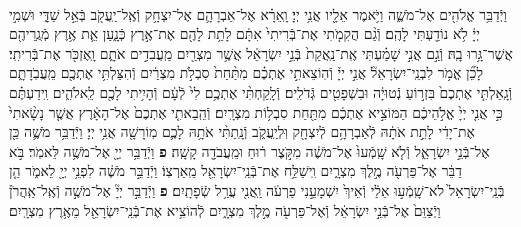 \documentclass[twoside, openany, parskip=half, 11pt]{book}
\begin{document}
\begin{footnotesize}
\begin{multicols}{2}
\\
וַיְֿדַבֵּ֥ר אֱלֹהִ֖ים אֶל־מֹשֶׁ֑ה וַיֹּ֥אמֶר אֵלָ֖יו אֲנִ֥י יְיָ׃ וָֽאֵרָ֗א אֶל־אַבְרָהָ֛ם אֶל־יִצְחָ֥ק וְֿאֶֽל־יַֽעֲקֹ֖ב בְּֿאֵ֣ל שַׁדָּ֑י וּשְׁמִ֣י יְיָ֔ לֹ֥א נוֹדַ֖עְתִּי לָהֶֽם׃ וְֿגַ֨ם הֲקִמֹ֤תִי אֶת־בְּֿרִיתִי֙ אִתָּ֔ם לָתֵ֥ת לָהֶ֖ם אֶת־אֶ֣רֶץ כְּֿנָ֑עַן אֵ֛ת אֶ֥רֶץ מְֿגֻֽרֵיהֶ֖ם אֲשֶׁר־גָּ֥רוּ בָֽהּ׃ וְֿגַ֣ם אֲנִ֣י שָׁמַ֗עְתִּי אֶֽת־נַֽאֲקַת֙ בְּֿנֵ֣י יִשְׂרָאֵ֔ל אֲשֶׁ֥ר מִצְרַ֖יִם מַֽעֲבִדִ֣ים אֹתָ֑ם וָֽאֶזְכֹּ֖ר אֶת־בְּֿרִיתִֽי׃  לָכֵ֞ן אֱמֹ֥ר לִבְנֵֽי־יִשְׂרָאֵל֘ אֲנִ֣י יְיָ֒ וְֿהֽוֹצֵאתִ֣י אֶתְכֶ֗ם מִתַּ֨חַת֙ סִבְלֹ֣ת מִצְרַ֔יִם וְֿהִצַּלְתִּ֥י אֶתְכֶ֖ם מֵֽעֲבֹֽדָתָ֑ם וְֿגָֽאַלְתִּ֤י אֶתְכֶם֙ בִּזְר֣וֹעַ נְֿטוּיָ֔ה וּבִשְׁפָטִ֖ים גְּֿדֹלִֽים׃ וְֿלָֽקַחְתִּ֨י אֶתְכֶ֥ם לִי֙ לְֿעָ֔ם וְֿהָיִ֥יתִי לָכֶ֖ם לֵֽאלֹהִ֑ים וִֽידַעְתֶּ֗ם כִּ֣י אֲנִ֤י יְיָ֙ אֱלֹ֣הֵיכֶ֔ם הַמּוֹצִ֣יא אֶתְכֶ֔ם מִתַּ֖חַת סִבְל֥וֹת מִצְרָֽיִם׃ וְֿהֵֽבֵאתִ֤י אֶתְכֶם֙ אֶל־הָאָ֔רֶץ אֲשֶׁ֤ר נָשָׂ֨אתִי֙ אֶת־יָדִ֔י לָתֵ֣ת אֹתָ֔הּ לְֿאַבְרָהָ֥ם לְֿיִצְחָ֖ק וּֽלְיַֽעֲקֹ֑ב וְֿנָֽתַתִּ֨י אֹתָ֥הּ לָכֶ֛ם מֽוֹרָשָׁ֖ה אֲנִ֥י יְיָ׃ וַיְֿדַבֵּ֥ר מֹשֶׁ֛ה כֵּ֖ן אֶל־בְּֿנֵ֣י יִשְׂרָאֵ֑ל וְֿלֹ֤א שָֽׁמְֿעוּ֙ אֶל־מֹשֶׁ֔ה מִקֹּ֣צֶר ר֔וּחַ וּמֵֽעֲבֹדָ֖ה קָשָֽׁה׃ \textbf{פ}
וַיְֿדַבֵּ֥ר יְיָ֖ אֶל־מֹשֶׁ֥ה לֵּאמֹֽר׃ בֹּ֣א דַבֵּ֔ר אֶל־פַּרְעֹ֖ה מֶ֣לֶךְ מִצְרָ֑יִם וִֽישַׁלַּ֥ח אֶת־בְּֿנֵֽי־יִשְׂרָאֵ֖ל מֵֽאַרְצֽוֹ׃ וַיְֿדַבֵּ֣ר מֹשֶׁ֔ה לִפְנֵ֥י יְיָ֖ לֵאמֹ֑ר הֵ֤ן בְּֿנֵֽי־יִשְׂרָאֵל֙ לֹא־שָֽׁמְֿע֣וּ אֵלַ֔י וְֿאֵיךְ֙ יִשְׁמָעֵ֣נִי פַרְעֹ֔ה וַֽאֲנִ֖י עֲרַ֥ל שְֿׂפָתָֽיִם׃ \textbf{פ}
וַיְֿדַבֵּ֣ר יְיָ֘ אֶל־מֹשֶׁ֣ה וְֿאֶֽל־אַֽהֲרֹן֒ וַיְֿצַוֵּם֙ אֶל־בְּֿנֵ֣י יִשְׂרָאֵ֔ל וְֿאֶל־פַּרְעֹ֖ה מֶ֣לֶךְ מִצְרָ֑יִם לְֿהוֹצִ֥יא אֶת־בְּֿנֵֽי־יִשְׂרָאֵ֖ל מֵאֶ֥רֶץ מִצְרָֽיִם׃


\end{multicols}
\end{footnotesize}
\end{document}
